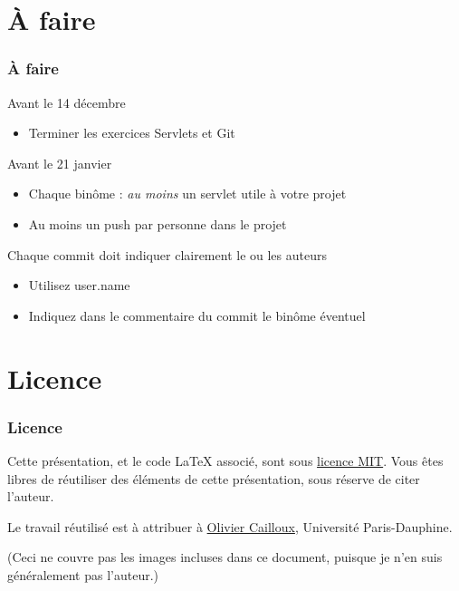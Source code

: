 \documentclass[english, french]{beamer}
\begin{document}
\section{À faire}
\begin{frame}
	\frametitle{À faire}
	\begin{block}{Avant le 14 décembre}
		\begin{itemize}
			\item Terminer les exercices Servlets et Git
		\end{itemize}
	\end{block}
	\begin{block}{Avant le 21 janvier}
		\begin{itemize}
			\item[+\footnote{Le + indique que cet aspect intervient dans la note}] Chaque binôme : \emph{au moins} un servlet utile à votre projet
			\item[+] Au moins un push par personne dans le projet
		\end{itemize}
	\end{block}
	Chaque commit doit indiquer clairement le ou les auteurs
	\begin{itemize}
		\item Utilisez user.name
		\item Indiquez dans le commentaire du commit le binôme éventuel
	\end{itemize}
\end{frame}

\appendix
\AtBeginSection{
}
\section{Licence}
\begin{frame}
	\frametitle{Licence}
	Cette présentation, et le code LaTeX associé, sont sous \href{http://opensource.org/licenses/MIT}{licence MIT}. Vous êtes libres de réutiliser des éléments de cette présentation, sous réserve de citer l’auteur.
	
	Le travail réutilisé est à attribuer à \href{http://www.lamsade.dauphine.fr/~ocailloux/}{Olivier Cailloux}, Université Paris-Dauphine.
	
	\small{(Ceci ne couvre pas les images incluses dans ce document, puisque je n’en suis généralement pas l’auteur.)}
\end{frame}
\end{document}
